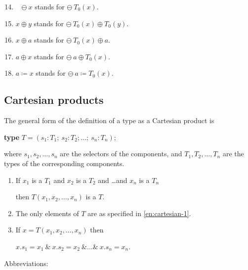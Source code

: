 \begin{enumerate}[leftmargin=2\parindent, label=(\arabic*)]
	\setcounter{enumi}{13}
	
	\item ~ $\ominus\ x$ stands for $\ominus\ T_0(x)$.

	\item $x \oplus y$ stands for $\ominus\ T_0(x) \oplus T_0(y)$.
	
	\item $x \oplus a$ stands for $\ominus\ T_0(x) \oplus a.$

	\item $a \oplus x$ stands for $\ominus\ a \oplus T_0(x).$

	\item $a \coloneq x$ stands for $\ominus\ a\coloneq T_0(x)$.
\end{enumerate}

\subsection{Cartesian products}

The general form of the definition of a type as a Cartesian product is

\quad \textbf{type} $T = (s_1 : T_1;\ s_2: T_2; \dots ;\ s_n: T_n);$

\noindent
where $s_1, s_2, \dots , s_n$ are the selectors of the components, and $T_1, T_2, \dots, T_n$ are the types of the corresponding components.

\begin{enumerate}[leftmargin=2\parindent, label=(\arabic*)]
	\item \label{en:cartesian-1}
	If $x_1$ is a $T_1$ and $x_2$ is a $T_2$ and \dots and $x_n$ is a $T_n$

	\quad then $T(x_1, x_2, \dots, x_n)$ is a $T$.

	\item The only elements of $T$ are as specified in \ref{en:cartesian-1}.

	\item If $x = T(x_1, x_2, \dots, x_n)$ then

	\quad $x.s_1 = x_1\ \&\ x.s_2 = x_2\ \& \dots \&\ x.s_n = x_n$.

\end{enumerate}

\noindent
Abbreviations:

